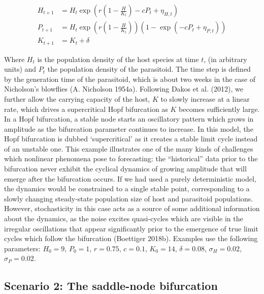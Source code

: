 \documentclass{article}
\begin{document}
\begin{align}
H_{t+1} &= H_t \exp \left( r \left(1 - \tfrac{H}{K_t}\right) - c P_t + \eta_{H,t} \right) \\
P_{t+1} &= H_t \exp \left( r \left(1 - \tfrac{H}{K_t}\right) \right)  \left(1 -  \exp \left(- c P_t + \eta_{P,t}\right) \right) \\
K_{t+1} &= K_t + \delta
\label{hopf}
\end{align}

Where \(H_t\) is the population density of the host species at time
\(t\), (in arbitrary units) and \(P_t\) the population density of the
parasitoid. The time step is defined by the generation time of the
parasitoid, which is about two weeks in the case of Nicholson's
blowflies (A. Nicholson 1954a). Following Dakos et al. (2012), we
further allow the carrying capacity of the host, \(K\) to slowly
increase at a linear rate, which drives a supercritical Hopf bifurcation
as \(K\) becomes sufficiently large. In a Hopf bifurcation, a stable
node starts an oscillatory pattern which grows in amplitude as the
bifurcation parameter continues to increase. In this model, the Hopf
bifurcation is dubbed `supercritical' as it creates a stable limit cycle
instead of an unstable one. This example illustrates one of the many
kinds of challenges which nonlinear phenomena pose to forecasting: the
``historical'' data prior to the bifurcation never exhibit the cyclical
dynamics of growing amplitude that will emerge after the bifurcation
occurs. If we had used a purely deterministic model, the dynamics would
be constrained to a single stable point, corresponding to a slowly
changing steady-state population size of host and parasitoid
populations. However, stochasticity in this case acts as a source of
some additional information about the dynamics, as the noise excites
quasi-cycles which are visible in the irregular oscillations that appear
significantly prior to the emergence of true limit cycles which follow
the bifurcation (Boettiger 2018b). Examples use the following
parameters: \(H_0 = 9\), \(P_0 = 1\), \(r = 0.75\), \(c = 0.1\),
\(K_0 = 14\), \(\delta = 0.08\), \(\sigma_H = 0.02\),
\(\sigma_P = 0.02\).

\hypertarget{scenario-2-the-saddle-node-bifurcation}{%
\subsection{Scenario 2: The saddle-node
bifurcation}\label{scenario-2-the-saddle-node-bifurcation}}
\end{document}
